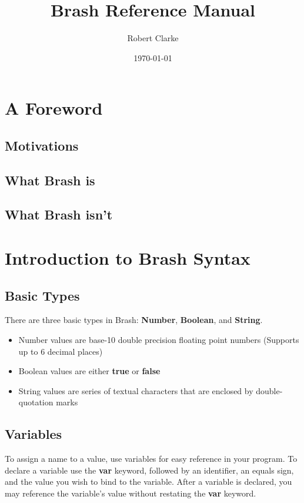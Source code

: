 \documentclass{article}
\title{Brash Reference Manual}
\author{Robert Clarke}
\date{\today}
\begin{document}
\maketitle
\tableofcontents
\clearpage

\section{A Foreword}
\subsection{Motivations}
\subsection{What Brash is}
\subsection{What Brash isn't}

\section{Introduction to Brash Syntax}

\subsection{Basic Types}
There are three basic types in Brash: \textbf{Number}, \textbf{Boolean}, and \textbf{String}.
\begin{itemize}
	\item Number values are base-10 double precision floating point numbers (Supports up to 6 decimal places)
	\item Boolean values are either \textbf{true} or \textbf{false}
	\item String values are series of textual characters that are enclosed by double-quotation marks
\end{itemize}
\begin{minipage}{\linewidth}

\end{minipage}


\subsection{Variables}
To assign a name to a value, use variables for easy reference in your program.
To declare a variable use the \textbf{var} keyword, followed by an identifier, an equals sign, and the value you wish to bind to the variable.
After a variable is declared, you may reference the variable's value without restating the \textbf{var} keyword.
\begin{minipage}{\linewidth}

\end{minipage}
\end{document}
